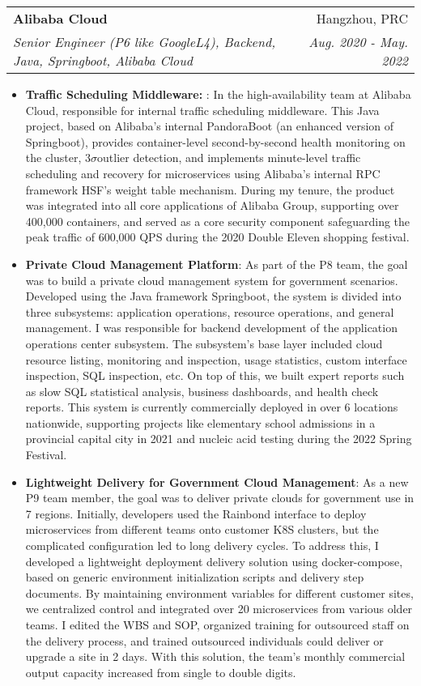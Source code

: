 \documentclass[letterpaper,11pt]{article}
\makeatletter
\newcommand{\resumeItem}[2]{
	\item\small{
		\textbf{#1}{: #2 \vspace{-2pt}}
	}
}
\newcommand{\resumeSubheading}[4]{
	\vspace{-1pt}\item
	\begin{tabular*}{0.97\textwidth}[t]{l@{\extracolsep{\fill}}r}
		\textbf{#1} & #2 \\
		\textit{\small#3} & \textit{\small #4} \\
	\end{tabular*}\vspace{-5pt}
}
\newcommand{\resumeItemListStart}{\begin{itemize}}
\newcommand{\resumeItemListEnd}{\end{itemize}\vspace{-5pt}}
\makeatother
\begin{document}
\begin{spacing}{0.86}
	\resumeSubheading
	{Alibaba Cloud}{Hangzhou, PRC}
	{Senior Engineer (P6 like GoogleL4), Backend, Java, Springboot, Alibaba Cloud}{Aug. 2020 - May. 2022}
	\resumeItemListStart
	\resumeItem{Traffic Scheduling Middleware: }
	{In the high-availability team at Alibaba Cloud, responsible for internal traffic scheduling middleware. This Java project, based on Alibaba's internal PandoraBoot (an enhanced version of Springboot), provides container-level second-by-second health monitoring on the cluster, $3\sigma$outlier detection, and implements minute-level traffic scheduling and recovery for microservices using Alibaba's internal RPC framework HSF's weight table mechanism. During my tenure, the product was integrated into all core applications of Alibaba Group, supporting over 400,000 containers, and served as a core security component safeguarding the peak traffic of 600,000 QPS during the 2020 Double Eleven shopping festival.}
	\resumeItem{Private Cloud Management Platform}
	{As part of the P8 team, the goal was to build a private cloud management system for government scenarios. Developed using the Java framework Springboot, the system is divided into three subsystems: application operations, resource operations, and general management. I was responsible for backend development of the application operations center subsystem. The subsystem’s base layer included cloud resource listing, monitoring and inspection, usage statistics, custom interface inspection, SQL inspection, etc. On top of this, we built expert reports such as slow SQL statistical analysis, business dashboards, and health check reports. This system is currently commercially deployed in over 6 locations nationwide, supporting projects like elementary school admissions in a provincial capital city in 2021 and nucleic acid testing during the 2022 Spring Festival.}
	\resumeItem{Lightweight Delivery for Government Cloud Management}
	{As a new P9 team member, the goal was to deliver private clouds for government use in 7 regions. Initially, developers used the Rainbond interface to deploy microservices from different teams onto customer K8S clusters, but the complicated configuration led to long delivery cycles. To address this, I developed a lightweight deployment delivery solution using docker-compose, based on generic environment initialization scripts and delivery step documents. By maintaining environment variables for different customer sites, we centralized control and integrated over 20 microservices from various older teams. I edited the WBS and SOP, organized training for outsourced staff on the delivery process, and trained outsourced individuals could deliver or upgrade a site in 2 days. With this solution, the team’s monthly commercial output capacity increased from single to double digits.}
	\resumeItemListEnd
	

\end{spacing}
\end{document}
